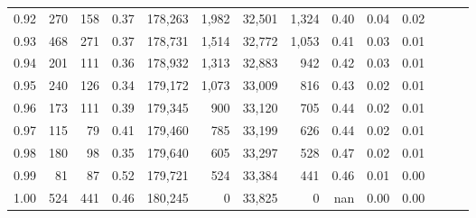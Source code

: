 \begin{tabular}{rrrrrrrrrrrrrr}
0.92 &    270 &  158 &  0.37 &  178,263 &    1,982 &  32,501 &   1,324 &  0.40 &  0.04 &      0.02 \\
0.93 &    468 &  271 &  0.37 &  178,731 &    1,514 &  32,772 &   1,053 &  0.41 &  0.03 &      0.01 \\
0.94 &    201 &  111 &  0.36 &  178,932 &    1,313 &  32,883 &     942 &  0.42 &  0.03 &      0.01 \\
0.95 &    240 &  126 &  0.34 &  179,172 &    1,073 &  33,009 &     816 &  0.43 &  0.02 &      0.01 \\
0.96 &    173 &  111 &  0.39 &  179,345 &      900 &  33,120 &     705 &  0.44 &  0.02 &      0.01 \\
0.97 &    115 &   79 &  0.41 &  179,460 &      785 &  33,199 &     626 &  0.44 &  0.02 &      0.01 \\
0.98 &    180 &   98 &  0.35 &  179,640 &      605 &  33,297 &     528 &  0.47 &  0.02 &      0.01 \\
0.99 &     81 &   87 &  0.52 &  179,721 &      524 &  33,384 &     441 &  0.46 &  0.01 &      0.00 \\
1.00 &    524 &  441 &  0.46 &  180,245 &        0 &  33,825 &       0 &   nan &  0.00 &      0.00 \\
\bottomrule
\end{tabular}
